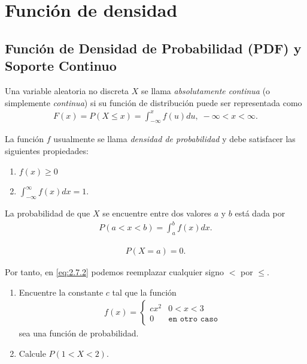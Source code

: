 \section{Función de densidad}

\subsection{Función de Densidad de Probabilidad (PDF) y Soporte Continuo}

	Una variable aleatoria no discreta $X$ se llama \emph{absolutamente continua} (o simplemente \emph{continua}) si su función de distribución puede ser representada como
	\begin{align}
		 \label{eq:2.7.1}
		 F(x)=P(X \leq x)=\int_{-\infty}^{x} f(u)du, \; -\infty < x <\infty.
	\end{align}


	La función $f$ usualmente se llama \emph{densidad de probabilidad} y debe satisfacer las siguientes propiedades:
	\begin{enumerate}
		\item $f(x)\geq 0 $
		\item $\displaystyle \int_{-\infty}^{\infty}f(x)dx=1.$
	\end{enumerate}




	La probabilidad de que $X$ se encuentre entre dos valores $a$ y $b$ está dada por
	\begin{align}
		\label{eq:2.7.2}
		P(a < x <b)=\int_{a}^{b}f(x)dx.
	\end{align}



	\begin{align}
		\label{eq:2.7.3}
		P(X=a)=0.
	\end{align}


Por tanto, en \eqref{eq:2.7.2} podemos reemplazar cualquier signo $<$ por $\leq.$


	\begin{ejemplo}
		\label{exmp:2.7.1}
		\begin{enumerate}
			\item Encuentre la constante $c$ tal que la función
			\begin{align}
				f(x)=
				\begin{cases}
					cx^{2} & 0 < x < 3 \\
					0 & \texttt{en otro caso}
				\end{cases}
			\end{align}
			sea una función de probabilidad. 
			\item Calcule $P(1 < X < 2).$
		\end{enumerate}

	\end{ejemplo}



